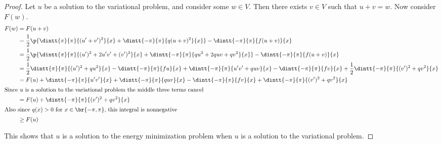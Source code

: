 \documentclass[11pt, oneside]{article}
\begin{document}
\begin{enumerate}
\begin{enumerate}
      \begin{proof}
        Let $u$ be a solution to the variational problem, and consider some
        $w \in V$.
        Then there exists $v \in V$ such that $u + v = w$.
        Now consider $F(w)$.
        \begin{align*}
          F(w) &= F(u + v) \\
          &= \frac{1}{2}\p{\dintt{\pi}{\pi}{(u'+v')^2}{x} + \dintt{-\pi}{\pi}{q(u+v)^2}{x}} - \dintt{-\pi}{\pi}{f(u+v)}{x} \\
          &= \frac{1}{2}\p{\dintt{\pi}{\pi}{(u')^2+2u'v' + (v')^2}{x} + \dintt{-\pi}{\pi}{qu^2+2quv + qv^2}{x}} - \dintt{-\pi}{\pi}{f(u+v)}{x} \\
          &= \frac{1}{2}\dintt{\pi}{\pi}{(u')^2 + qu^2}{x} - \dintt{-\pi}{\pi}{fu}{x} + \dintt{-\pi}{\pi}{u'v' + quv}{x} - \dintt{-\pi}{\pi}{fv}{x} + \frac{1}{2}\dintt{-\pi}{\pi}{(v')^2 + qv^2}{x} \\
          &= F(u) + \dintt{-\pi}{\pi}{u'v'}{x} + \dintt{-\pi}{\pi}{quv}{x} - \dintt{-\pi}{\pi}{fv}{x} +  \dintt{-\pi}{\pi}{(v')^2 + qv^2}{x} \\
          \intertext{Since $u$ is a solution to the variational problem the middle three terms cancel}
          &= F(u) +  \dintt{-\pi}{\pi}{(v')^2 + qv^2}{x} \\
          \intertext{Also since $q(x) > 0$ for $x \in \br{-\pi, \pi}$, this integral is nonnegative}
          &\ge F(u)
        \end{align*}

        This shows that $u$ is a solution to the energy minimization problem when
        $u$ is a solution to the variational problem.


\end{proof}
\end{enumerate}
\end{enumerate}
\end{document}
